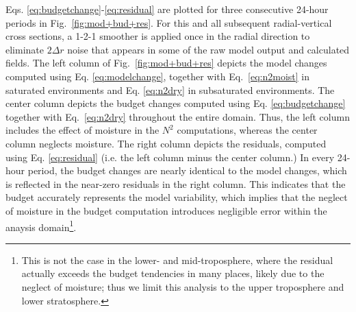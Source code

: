 \documentclass{ametsoc}
\begin{document}
Eqs. \ref{eq:budgetchange}-\ref{eq:residual} are plotted for three consecutive 24-hour periods in Fig.~\ref{fig:mod+bud+res}.
For this and all subsequent radial-vertical cross sections, a 1-2-1 smoother is applied once in the radial direction to eliminate $2\Delta r$ noise that appears in some of the raw model output and calculated fields.
      The left column of Fig.~\ref{fig:mod+bud+res} depicts the model changes computed using Eq. \ref{eq:modelchange}, together with Eq.~\ref{eq:n2moist} in saturated environments and Eq. \ref{eq:n2dry} in subsaturated environments.
The center column depicts the budget changes computed using Eq. \ref{eq:budgetchange} together with Eq.~\ref{eq:n2dry} throughout the entire domain.
Thus, the left column includes the effect of moisture in the $N^2$ computations, whereas the center column neglects moisture.
The right column depicts the residuals, computed using Eq. \ref{eq:residual} (i.e. the left column minus the center column.)
In every 24-hour period, the budget changes are nearly identical to the model changes, which is reflected in the near-zero residuals in the right column.
This indicates that the budget accurately represents the model variability, which implies that the neglect of moisture in the budget computation introduces negligible error within the anaysis domain\footnote{This is not the case in the lower- and mid-troposphere, where the residual actually exceeds the budget tendencies in many places, likely due to the neglect of moisture; thus we limit this analysis to the upper troposphere and lower stratosphere.}.
\end{document}
